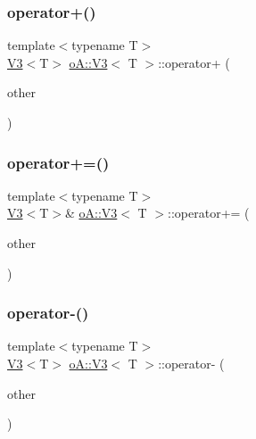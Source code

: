 \mbox{\label{structo_a_1_1_v3_a2cf028f3352c9165b24f26e5c2bb173d}} 
\subsubsection{\texorpdfstring{operator+()}{operator+()}}
{\footnotesize\ttfamily template$<$typename T$>$ \\
\mbox{\hyperlink{structo_a_1_1_v3}{V3}}$<$T$>$ \mbox{\hyperlink{structo_a_1_1_v3}{o\+A\+::\+V3}}$<$ T $>$\+::operator+ (\begin{DoxyParamCaption}\item[{const \mbox{\hyperlink{structo_a_1_1_v3}{o\+A\+::\+V3}}$<$ T $>$ \&}]{other }\end{DoxyParamCaption})\hspace{0.3cm}{\ttfamily [inline]}}

\mbox{\label{structo_a_1_1_v3_ac69717bc685dc757a3e11566bdc9da00}} 
\subsubsection{\texorpdfstring{operator+=()}{operator+=()}}
{\footnotesize\ttfamily template$<$typename T$>$ \\
\mbox{\hyperlink{structo_a_1_1_v3}{V3}}$<$T$>$\& \mbox{\hyperlink{structo_a_1_1_v3}{o\+A\+::\+V3}}$<$ T $>$\+::operator+= (\begin{DoxyParamCaption}\item[{const \mbox{\hyperlink{structo_a_1_1_v3}{o\+A\+::\+V3}}$<$ T $>$ \&}]{other }\end{DoxyParamCaption})\hspace{0.3cm}{\ttfamily [inline]}}

\mbox{\label{structo_a_1_1_v3_a3e6d329582bd5e0b4ca407576b5135e4}} 
\subsubsection{\texorpdfstring{operator-\/()}{operator-()}}
{\footnotesize\ttfamily template$<$typename T$>$ \\
\mbox{\hyperlink{structo_a_1_1_v3}{V3}}$<$T$>$ \mbox{\hyperlink{structo_a_1_1_v3}{o\+A\+::\+V3}}$<$ T $>$\+::operator-\/ (\begin{DoxyParamCaption}\item[{const \mbox{\hyperlink{structo_a_1_1_v3}{o\+A\+::\+V3}}$<$ T $>$ \&}]{other }\end{DoxyParamCaption})\hspace{0.3cm}{\ttfamily [inline]}}

